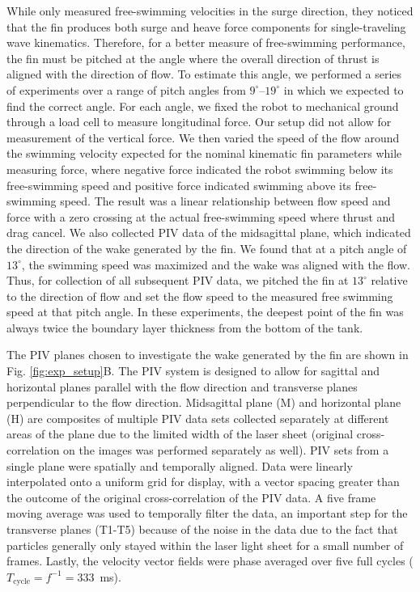 \documentclass[onecolumn]{IEEEtran}
\begin{document}
While \citet*{Cure11a} only measured free-swimming velocities in the surge
direction,
they noticed that the fin produces both surge and heave force components
for single-traveling wave kinematics. Therefore, for a better
measure of free-swimming performance, the fin must be pitched at the angle
where the overall direction of thrust is aligned with the direction of
flow. To estimate this angle, we performed a series of experiments over a
range of pitch angles from $9^\circ$--$19^\circ$ in which we expected to find 
the correct angle. For each angle, we fixed the
robot to mechanical ground through a load cell to measure longitudinal
force.  Our setup did not allow for measurement of the vertical force. 
We then varied the speed of the flow around the swimming velocity
expected for the nominal kinematic fin parameters while measuring force,
where negative force indicated the robot swimming below its free-swimming
speed and positive force indicated swimming above its free-swimming speed.
The result was a linear relationship between flow speed and force with a
zero crossing at the actual free-swimming speed where thrust and drag
cancel. We also collected PIV data of the midsagittal plane, which
indicated the direction of the wake generated by the fin. We found that at
a pitch angle of $13^\circ$, the swimming speed was maximized and the wake
was aligned with the flow. Thus, for collection of all subsequent PIV data, we
pitched the fin at $13^\circ$ relative to the direction of flow and set
the flow speed to the measured free swimming speed at that pitch angle.
In these experiments, the deepest point of the fin was always twice 
the boundary layer thickness from the bottom of the tank.

The PIV planes chosen to investigate the wake generated by the fin are
shown in Fig. \ref{fig:exp_setup}B. The PIV system is designed to allow
for sagittal and horizontal planes parallel with the flow direction and
transverse planes perpendicular to the flow direction. 
Midsagittal plane (M) and horizontal plane (H) are composites of multiple
PIV data sets collected separately at different areas of the plane due to the limited width of the laser sheet
(original cross-correlation on the images was performed separately as
well). PIV sets from a single plane were spatially and temporally aligned. Data were linearly interpolated onto a
uniform grid for display, with a vector spacing greater than the outcome
of the original cross-correlation of the PIV data. A five frame moving
average was used to temporally filter the data, an important step for the
transverse planes (T1-T5) because of the noise in the data due to the fact
that particles generally only stayed within the laser light sheet for a small number of frames. Lastly, the
velocity vector fields were phase averaged over five full cycles ($T_\text{cycle}
= {f}^{-1} = 333$~ms).
\end{document}
